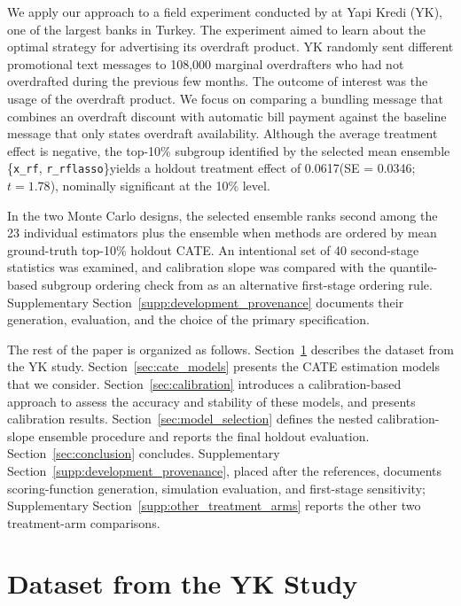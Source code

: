 \documentclass[12pt]{article}
\newcommand{\TargetFrac}{10{\%}\xspace}
\newcommand{\MainSelected}{\{\texttt{x\_rf}, \texttt{r\_rflasso}\}}
\newcommand{\MainHOATE}{0.0617}
\newcommand{\MainHOSE}{0.0346}
\newcommand{\MainHOT}{1.78}
\begin{document}
We apply our approach to a field experiment conducted by \citet{alan2018} at Yapi Kredi (YK), one of the largest banks in Turkey. The experiment aimed to learn about the optimal strategy for advertising its overdraft product. YK randomly sent different promotional text messages to 108,000 marginal overdrafters who had not overdrafted during the previous few months. The outcome of interest was the usage of the overdraft product. We focus on comparing a bundling message that combines an overdraft discount with automatic bill payment against the baseline message that only states overdraft availability. Although the average treatment effect is negative, the top-\TargetFrac subgroup identified by the selected mean ensemble \MainSelected yields a holdout treatment effect of \MainHOATE (SE = \MainHOSE; $t=\MainHOT$), nominally significant at the 10{\%} level.

In the two Monte Carlo designs, the selected ensemble ranks second among the 23 individual estimators plus the ensemble when methods are ordered by mean ground-truth top-\TargetFrac holdout CATE. An intentional set of 40 second-stage statistics was examined, and calibration slope was compared with the quantile-based subgroup ordering check from \citet{dwivedi2020} as an alternative first-stage ordering rule. Supplementary Section~\ref{supp:development_provenance} documents their generation, evaluation, and the choice of the primary specification.

The rest of the paper is organized as follows. Section~\ref{sec:data} describes the dataset from the YK study. Section~\ref{sec:cate_models} presents the CATE estimation models that we consider. Section~\ref{sec:calibration} introduces a calibration-based approach to assess the accuracy and stability of these models, and presents calibration results. Section~\ref{sec:model_selection} defines the nested calibration-slope ensemble procedure and reports the final holdout evaluation. Section~\ref{sec:conclusion} concludes. Supplementary Section~\ref{supp:development_provenance}, placed after the references, documents scoring-function generation, simulation evaluation, and first-stage sensitivity; Supplementary Section~\ref{supp:other_treatment_arms} reports the other two treatment-arm comparisons.

\section{Dataset from the YK Study}
\label{sec:data}
\end{document}
